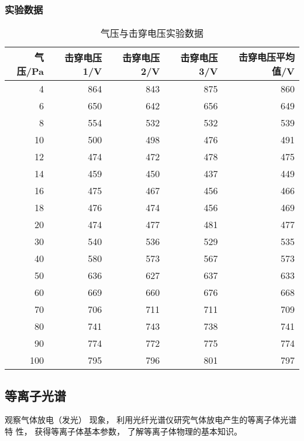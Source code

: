 \documentclass[dvipsnames, svgnames,a4paper,11pt]{article}
\begin{document}
\subsubsection{实验数据}\begin{table}[H]
	\centering
	\caption{气压与击穿电压实验数据}
	\begin{tabular}{rrrrr}
		\toprule
		气压/Pa & 击穿电压1/V & 击穿电压2/V & 击穿电压3/V & 击穿电压平均值/V \\
		\midrule
			4 &     864 &     843 &     875 &       860 \\
			6 &     650 &     642 &     656 &       649 \\
			8 &     554 &     532 &     532 &       539 \\
		   10 &     500 &     498 &     476 &       491 \\
		   12 &     474 &     472 &     478 &       475 \\
		   14 &     459 &     450 &     437 &       449 \\
		   16 &     475 &     467 &     456 &       466 \\
		   18 &     476 &     474 &     456 &       469 \\
		   20 &     474 &     477 &     481 &       477 \\
		   30 &     540 &     536 &     529 &       535 \\
		   40 &     580 &     573 &     567 &       573 \\
		   50 &     636 &     627 &     637 &       633 \\
		   60 &     669 &     660 &     676 &       668 \\
		   70 &     706 &     711 &     711 &       709 \\
		   80 &     741 &     743 &     738 &       741 \\
		   90 &     774 &     772 &     775 &       774 \\
		  100 &     795 &     796 &     801 &       797 \\
		\bottomrule
	\end{tabular}
	\end{table}
	
	
\subsection{等离子光谱}
观察气体放电（发光） 现象， 利用光纤光谱仪研究气体放电产生的等离子体光谱特
性， 获得等离子体基本参数， 了解等离子体物理的基本知识。
\end{document}
